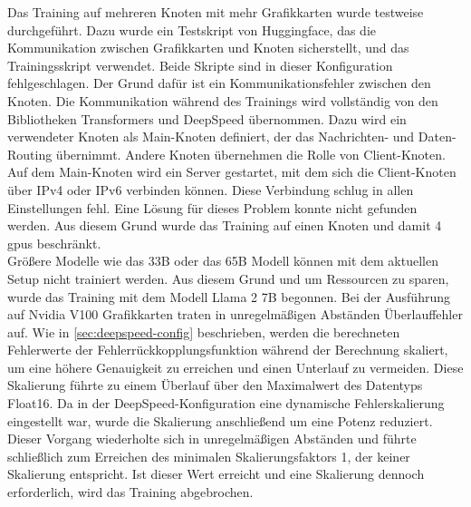 Das Training auf mehreren Knoten mit mehr Grafikkarten wurde testweise durchgeführt.
Dazu wurde ein Testskript von Huggingface, das die Kommunikation zwischen Grafikkarten und Knoten sicherstellt, und das Trainingsskript verwendet.
Beide Skripte sind in dieser Konfiguration fehlgeschlagen.
Der Grund dafür ist ein Kommunikationsfehler zwischen den Knoten.
Die Kommunikation während des Trainings wird vollständig von den Bibliotheken Transformers und DeepSpeed übernommen.
Dazu wird ein verwendeter Knoten als Main-Knoten definiert, der das Nachrichten- und Daten-Routing übernimmt.
Andere Knoten übernehmen die Rolle von Client-Knoten.
Auf dem Main-Knoten wird ein Server gestartet, mit dem sich die Client-Knoten über IPv4 oder IPv6 verbinden können.
Diese Verbindung schlug in allen Einstellungen fehl.
Eine Lösung für dieses Problem konnte nicht gefunden werden.
Aus diesem Grund wurde das Training auf einen Knoten und damit 4 \ac{gpu}s beschränkt.\\

Größere Modelle wie das 33B oder das 65B Modell können mit dem aktuellen Setup nicht trainiert werden.
Aus diesem Grund und um Ressourcen zu sparen, wurde das Training mit dem Modell Llama 2 7B begonnen.
Bei der Ausführung auf Nvidia V100 Grafikkarten traten in unregelmäßigen Abständen Überlauffehler auf.
Wie in \cref{sec:deepspeed-config} beschrieben, werden die berechneten Fehlerwerte der Fehlerrückkopplungsfunktion während der Berechnung skaliert, um eine höhere Genauigkeit zu erreichen und einen Unterlauf zu vermeiden.
Diese Skalierung führte zu einem Überlauf über den Maximalwert des Datentyps Float16.
Da in der DeepSpeed-Konfiguration eine dynamische Fehlerskalierung eingestellt war, wurde die Skalierung anschließend um eine Potenz reduziert.
Dieser Vorgang wiederholte sich in unregelmäßigen Abständen und führte schließlich zum Erreichen des minimalen Skalierungsfaktors 1, der keiner Skalierung entspricht.
Ist dieser Wert erreicht und eine Skalierung dennoch erforderlich, wird das Training abgebrochen.\\

